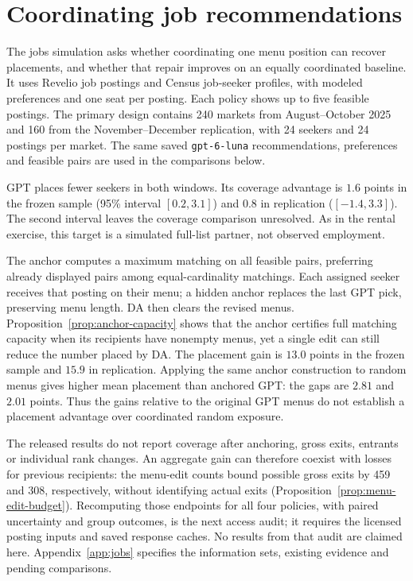 \section{Coordinating job recommendations}\label{sec:jobs}
The jobs simulation asks whether coordinating one menu position can recover
placements, and whether that repair improves on an equally coordinated
baseline. It uses Revelio job postings and Census job-seeker profiles, with
modeled preferences and one seat per posting. Each policy shows up to five
feasible postings. The primary design contains 240 markets from August--October
2025 and 160 from the November--December replication, with 24 seekers and
24 postings per market. The same saved \texttt{gpt-6-luna} recommendations,
preferences and feasible pairs are used in the comparisons below.

\begin{table}[ht]\centering\small
\caption{Jobs, primary design. Differences in percentage points. Coverage is
conditional on having a full-list DA partner; placement includes everyone.
The last column compares two coordinated policies and reports point estimates
only: its paired interval is not available in the released aggregates.}
\label{tab:jobs-coordination}

\end{table}

GPT places fewer seekers in both windows. Its coverage advantage is
$1.6$ points in the frozen sample (95\% interval $[0.2,3.1]$) and $0.8$
in replication ($[-1.4,3.3]$). The second interval leaves the coverage
comparison unresolved. As in the rental exercise, this target is a simulated
full-list partner, not observed employment.

The anchor computes a maximum matching on all feasible pairs, preferring
already displayed pairs among equal-cardinality matchings. Each assigned
seeker receives that posting on their menu; a hidden anchor replaces the
last GPT pick, preserving menu length. DA then clears the revised menus.
Proposition~\ref{prop:anchor-capacity} shows that the anchor certifies full
matching capacity when its recipients have nonempty menus, yet a single
edit can still reduce the number placed by DA.
The placement gain is $13.0$ points in the frozen sample and $15.9$ in
replication. Applying the same anchor construction to random menus gives
higher mean placement than anchored GPT: the gaps are $2.81$ and $2.01$
points. Thus the gains relative to the original GPT menus do not establish a
placement advantage over coordinated random exposure.

The released results do not report coverage after anchoring, gross exits,
entrants or individual rank changes. An aggregate gain can therefore coexist
with losses for previous recipients: the menu-edit counts bound possible
gross exits by 459 and 308, respectively, without identifying actual exits
(Proposition~\ref{prop:menu-edit-budget}). Recomputing those endpoints for all four
policies, with paired uncertainty and group outcomes, is the next access
audit; it requires the licensed posting inputs and saved response caches.
No results from that audit are claimed here. Appendix~\ref{app:jobs}
specifies the information sets, existing evidence and pending comparisons.
